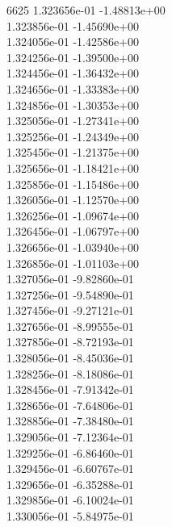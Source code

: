 6625	1.323656e-01	-1.48813e+00	\\ 	1.323856e-01	-1.45690e+00	\\ 	1.324056e-01	-1.42586e+00	\\ 	1.324256e-01	-1.39500e+00	\\ 	1.324456e-01	-1.36432e+00	\\ 	1.324656e-01	-1.33383e+00	\\ 	1.324856e-01	-1.30353e+00	\\ 	1.325056e-01	-1.27341e+00	\\ 	1.325256e-01	-1.24349e+00	\\ 	1.325456e-01	-1.21375e+00	\\ 	1.325656e-01	-1.18421e+00	\\ 	1.325856e-01	-1.15486e+00	\\ 	1.326056e-01	-1.12570e+00	\\ 	1.326256e-01	-1.09674e+00	\\ 	1.326456e-01	-1.06797e+00	\\ 	1.326656e-01	-1.03940e+00	\\ 	1.326856e-01	-1.01103e+00	\\ 	1.327056e-01	-9.82860e-01	\\ 	1.327256e-01	-9.54890e-01	\\ 	1.327456e-01	-9.27121e-01	\\ 	1.327656e-01	-8.99555e-01	\\ 	1.327856e-01	-8.72193e-01	\\ 	1.328056e-01	-8.45036e-01	\\ 	1.328256e-01	-8.18086e-01	\\ 	1.328456e-01	-7.91342e-01	\\ 	1.328656e-01	-7.64806e-01	\\ 	1.328856e-01	-7.38480e-01	\\ 	1.329056e-01	-7.12364e-01	\\ 	1.329256e-01	-6.86460e-01	\\ 	1.329456e-01	-6.60767e-01	\\ 	1.329656e-01	-6.35288e-01	\\ 	1.329856e-01	-6.10024e-01	\\ 	1.330056e-01	-5.84975e-01	\\ \hline
